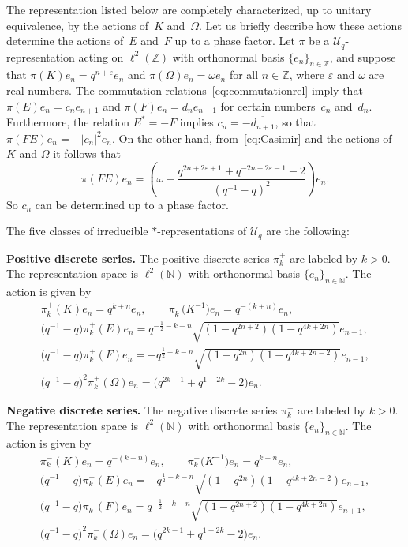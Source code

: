 \documentclass[pdftex]{sigma}
\numberwithin{equation}{section}
\numberwithin{theorem}{section}
\numberwithin{proposition}{section}
\numberwithin{lemma}{section}
\numberwithin{corollary}{section}
\numberwithin{definition}{section}
\numberwithin{example}{section}
\numberwithin{remark}{section}
\numberwithin{note}{section}
\newcommand{\N}{\mathbb N}
\newcommand{\Z}{\mathbb Z}
\newcommand{\eps}{\varepsilon}
\newcommand{\U}{\mathcal U}
\begin{document}
The representation listed below are completely characterized, up to unitary equivalence, by the actions of~$K$ and~$\Omega$. Let us brief\/ly describe how these actions determine the actions of~$E$ and~$F$ up to a phase factor. Let $\pi$ be a $\U_q$-representation acting on $\ell^2(\Z)$ with orthonormal basis $\{e_n\}_{n \in \Z}$, and suppose that $\pi(K)e_n=q^{n+\eps}e_n$ and $\pi(\Omega)e_n = \omega e_n$ for all $n \in \Z$, where $\eps$ and $\omega$ are real numbers. The commutation relations~\eqref{eq:commutationrel} imply that $\pi(E)e_n = c_n e_{n+1}$ and $\pi(F) e_n = d_n e_{n-1}$ for certain numbers~$c_n$ and~$d_n$. Furthermore, the relation $E^*=-F$ implies $c_n=-\overline{d_{n+1}}$, so that $\pi(FE) e_n = - |c_n|^2 e_n$. On the other hand, from~\eqref{eq:Casimir} and the actions of $K$ and $\Omega$ it follows that
\[
\pi(FE) e_n = \left(\omega-\frac{q^{2n+2\eps+1}+q^{-2n-2\eps-1}-2}{(q^{-1}-q)^2}\right)e_n.
\]
So $c_n$ can be determined up to a phase factor.

The f\/ive classes of irreducible $*$-representations of $\U_q$ are the following:

\textbf{Positive discrete series.} The positive discrete series $\pi^+_k$
are labeled by $k>0$. The representation space is $\ell^2(\N)$
with orthonormal basis $\{e_n\}_{n \in \N }$. The action is
given by
\begin{gather}
\pi^+_k(K)  e_n  = q^{k+n}  e_n, \qquad \pi^+_k\big(K^{-1}\big)  e_n =q^{-(k+n)} e_n, \nonumber \\
\big(q^{-1}-q\big)\pi^+_k(E)  e_n  = q^{-\frac12-k-n} \sqrt{(1-q^{2n+2})(1-q^{4k+2n})}  e_{n+1},  \nonumber\\
\big(q^{-1}-q\big)\pi^+_k(F)  e_n  = -q^{\frac12-k-n}
\sqrt{(1-q^{2n})(1-q^{4k+2n-2})}  e_{n-1},\nonumber\\
\big(q^{-1}-q\big)^2 \pi^+_k(\Omega)  e_n  = \big(q^{2k-1}+q^{1-2k}-2\big)  e_n.\label{eq:pos}
\end{gather}

\textbf{Negative discrete series.} The negative discrete series
$\pi^-_k$ are labeled by $k>0$. The representation space is
$\ell^2(\N)$ with orthonormal basis $\{e_n\}_{n \in \N}$. The action is given by
\begin{gather}
\pi^-_k(K) e_n = q^{-(k+n)} e_n, \qquad \pi^-_k\big(K^{-1}\big) e_n =q^{k+n} e_n,
 \nonumber\\
 \big(q^{-1}-q\big)\pi^-_k(E)  e_n  = -q^{\frac12-k-n}
\sqrt{(1-q^{2n})(1-q^{4k+2n-2})}  e_{n-1},
\nonumber\\
\big(q^{-1}-q\big)\pi^-_k(F) e_n = q^{-\frac12-k-n}
\sqrt{(1-q^{2n+2})(1-q^{4k+2n})} e_{n+1}, \nonumber\\
\big(q^{-1}-q\big)^2 \pi^-_k(\Omega) e_n = \big(q^{2k-1}+q^{1-2k}-2\big) e_n.\label{eq:neg}
\end{gather}
\end{document}
